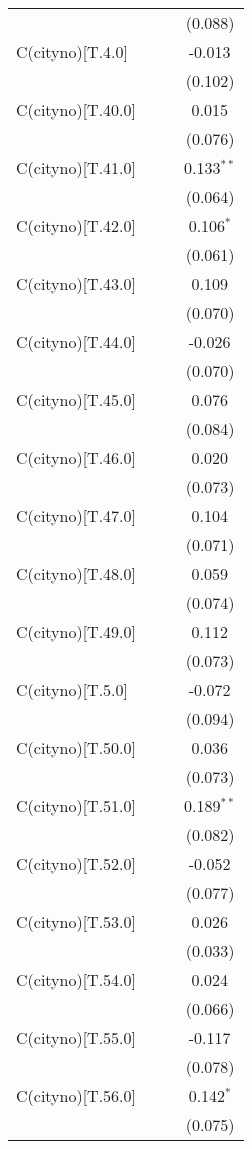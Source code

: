 \begin{table}[!htbp]
\begin{tabular}{@{\extracolsep{5pt}}lccc}
& & & (0.088) \\
 C(cityno)[T.4.0] & & & -0.013$^{}$ \\
& & & (0.102) \\
 C(cityno)[T.40.0] & & & 0.015$^{}$ \\
& & & (0.076) \\
 C(cityno)[T.41.0] & & & 0.133$^{**}$ \\
& & & (0.064) \\
 C(cityno)[T.42.0] & & & 0.106$^{*}$ \\
& & & (0.061) \\
 C(cityno)[T.43.0] & & & 0.109$^{}$ \\
& & & (0.070) \\
 C(cityno)[T.44.0] & & & -0.026$^{}$ \\
& & & (0.070) \\
 C(cityno)[T.45.0] & & & 0.076$^{}$ \\
& & & (0.084) \\
 C(cityno)[T.46.0] & & & 0.020$^{}$ \\
& & & (0.073) \\
 C(cityno)[T.47.0] & & & 0.104$^{}$ \\
& & & (0.071) \\
 C(cityno)[T.48.0] & & & 0.059$^{}$ \\
& & & (0.074) \\
 C(cityno)[T.49.0] & & & 0.112$^{}$ \\
& & & (0.073) \\
 C(cityno)[T.5.0] & & & -0.072$^{}$ \\
& & & (0.094) \\
 C(cityno)[T.50.0] & & & 0.036$^{}$ \\
& & & (0.073) \\
 C(cityno)[T.51.0] & & & 0.189$^{**}$ \\
& & & (0.082) \\
 C(cityno)[T.52.0] & & & -0.052$^{}$ \\
& & & (0.077) \\
 C(cityno)[T.53.0] & & & 0.026$^{}$ \\
& & & (0.033) \\
 C(cityno)[T.54.0] & & & 0.024$^{}$ \\
& & & (0.066) \\
 C(cityno)[T.55.0] & & & -0.117$^{}$ \\
& & & (0.078) \\
 C(cityno)[T.56.0] & & & 0.142$^{*}$ \\
& & & (0.075) \\

\end{tabular}
\end{table}
